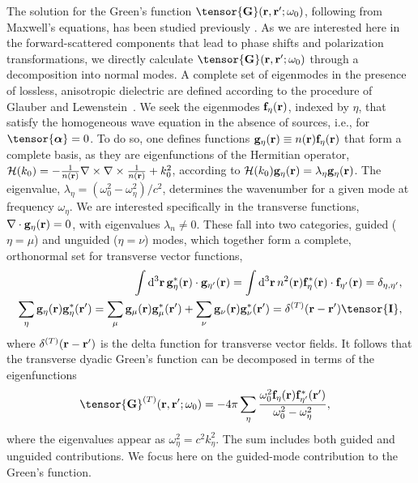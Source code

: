 \documentclass[preprint, aps,pra,onecolumn]{revtex4-1} %
\newcommand{\unittens}{\tensor{\mathbf{I}}}
\newcommand{\eigenf}{\mbf{f}_\eta}
\newcommand{\eigenfp}{\mbf{f}_{\eta'}}
\newcommand{\eigeng}{\mbf{g}_\eta}
\newcommand{\eigengp}{\mbf{g}_{\eta'}}
\begin{document}
The solution for the Green's function $\tensor{\mathbf{G}}(\br ,\br' ; \omega_0)$, following from Maxwell's equations,  
has been studied previously \cite{sakoda_optical_1996,sondergaard_general_2001,wubs_multiple-scattering_2004}.  As we are interested here in the forward-scattered components that lead to phase shifts and polarization transformations, we directly calculate $\tensor{\mathbf{G}}(\br ,\br' ; \omega_0)$ through a decomposition into normal modes.  A complete set of eigenmodes in the presence of lossless, anisotropic dielectric are defined according to the procedure of Glauber and Lewenstein~\cite{glauber_quantum_1991}.  We seek the eigenmodes $\eigenf(\mathbf{r})$, indexed by $\eta$, that satisfy the homogeneous wave equation in the absence of sources, i.e.,  for $\tensor{\boldsymbol{\alpha}} = 0$.  To do so, one defines functions $\eigeng(\mbf{r}) \equiv n(\br) \eigenf(\mbf{r})$ that form a complete basis, as they are eigenfunctions of the Hermitian operator, $\mathcal{H}(k_0) = -\frac{1}{n(\mathbf{r})} \nabla\times\nabla\times \frac{1}{n(\mathbf{r})} + k_0^2$, according to $\mathcal{H}(k_0)  \eigeng(\mbf{r}) = \lambda_\eta \eigeng(\mbf{r})$. The eigenvalue, $\lambda_\eta= (\omega_0^2-\omega_\eta^2)/c^2$, determines the wavenumber for a given mode at frequency $\omega_\eta$.  We are interested specifically in the transverse functions, $\nabla\cdot \eigeng(\br) = 0$, with eigenvalues $\lambda_n \neq 0$.  These fall into two categories, guided ($\eta = \mu$) and unguided ($\eta = \nu$) modes, which together form a complete, orthonormal set for transverse vector functions,
	\begin{align}
	\int \mathrm{d}^3\br \, \eigeng^*(\mbf{r}) \cdot \eigengp(\mbf{r})  = \int \mathrm{d}^3\br \, n^2(\br) \eigenf^* (\br)\cdot  \eigenfp(\br) =\delta_{\eta, \eta'},\label{Eq::Orthogonality}\\
	 \sum_\eta \mathbf{g}_\eta(\br) \mathbf{g}_\eta^*(\br') =  \sum_\mu \mathbf{g}_\mu(\br) \mathbf{g}_\mu^*(\br')  + \sum_\nu \mathbf{g}_\nu(\br) \mathbf{g}_\nu^*(\br')  =\delta^{(T)}(\br-\br')  \unittens, \label{Eq::Completeness}
	\end{align}
where $\delta^{(T)}(\mathbf{r}-\mathbf{r}')$ is the delta function for transverse vector fields.  It follows that the transverse dyadic Green's function can be decomposed in terms of the eigenfunctions~\cite{sakoda_optical_1996, sondergaard_general_2001}
	\begin{align}
		\tensor{\mathbf{G}}^{(T)}(\br,\br'; \omega_0) &= -4\pi \sum_{\eta} \frac{  \omega_0^2 \eigenf (\br) 
\eigenfp^* (\br')}{\omega_0^2-\omega_\eta^2},
	\end{align}
where the eigenvalues appear as $\omega_\eta^2 = c^2 k_\eta^2$.  The sum includes both guided and unguided contributions. We focus here on the guided-mode contribution to the Green's function. 
\end{document}
